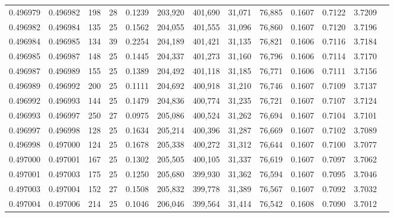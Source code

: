 \begin{tabular}{rrrrrrrrrrrrr}
0.496979 & 0.496982 & 198 &  28 &                                     0.1239 & 203,920 & 401,690 &  31,071 &  76,885 & 0.1607 & 0.7122 & 3.7209 \\
0.496982 & 0.496984 & 135 &  25 &                                     0.1562 & 204,055 & 401,555 &  31,096 &  76,860 & 0.1607 & 0.7120 & 3.7196 \\
0.496984 & 0.496985 & 134 &  39 &                                     0.2254 & 204,189 & 401,421 &  31,135 &  76,821 & 0.1606 & 0.7116 & 3.7184 \\
0.496985 & 0.496987 & 148 &  25 &                                     0.1445 & 204,337 & 401,273 &  31,160 &  76,796 & 0.1606 & 0.7114 & 3.7170 \\
0.496987 & 0.496989 & 155 &  25 &                                     0.1389 & 204,492 & 401,118 &  31,185 &  76,771 & 0.1606 & 0.7111 & 3.7156 \\
0.496989 & 0.496992 & 200 &  25 &                                     0.1111 & 204,692 & 400,918 &  31,210 &  76,746 & 0.1607 & 0.7109 & 3.7137 \\
0.496992 & 0.496993 & 144 &  25 &                                     0.1479 & 204,836 & 400,774 &  31,235 &  76,721 & 0.1607 & 0.7107 & 3.7124 \\
0.496993 & 0.496997 & 250 &  27 &                                     0.0975 & 205,086 & 400,524 &  31,262 &  76,694 & 0.1607 & 0.7104 & 3.7101 \\
0.496997 & 0.496998 & 128 &  25 &                                     0.1634 & 205,214 & 400,396 &  31,287 &  76,669 & 0.1607 & 0.7102 & 3.7089 \\
0.496998 & 0.497000 & 124 &  25 &                                     0.1678 & 205,338 & 400,272 &  31,312 &  76,644 & 0.1607 & 0.7100 & 3.7077 \\
0.497000 & 0.497001 & 167 &  25 &                                     0.1302 & 205,505 & 400,105 &  31,337 &  76,619 & 0.1607 & 0.7097 & 3.7062 \\
0.497001 & 0.497003 & 175 &  25 &                                     0.1250 & 205,680 & 399,930 &  31,362 &  76,594 & 0.1607 & 0.7095 & 3.7046 \\
0.497003 & 0.497004 & 152 &  27 &                                     0.1508 & 205,832 & 399,778 &  31,389 &  76,567 & 0.1607 & 0.7092 & 3.7032 \\
0.497004 & 0.497006 & 214 &  25 &                                     0.1046 & 206,046 & 399,564 &  31,414 &  76,542 & 0.1608 & 0.7090 & 3.7012 \\

\end{tabular}
